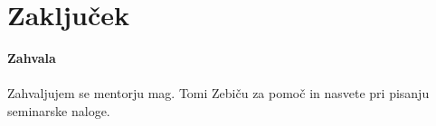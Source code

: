 \chapter{Zaključek}

\newpage
\noindent
\large \textbf{Zahvala} \\\\
\small
Zahvaljujem se mentorju mag. Tomi Zebiču za pomoč in nasvete pri pisanju seminarske naloge.